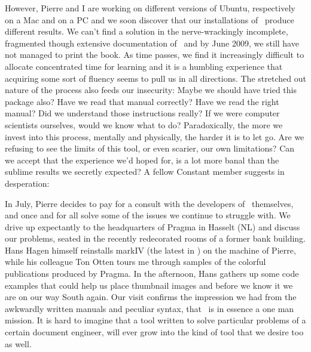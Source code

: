 However, Pierre and I are working on different versions of Ubuntu,
respectively on a Mac and on a PC and we soon discover that our
installations of \ConTeXt\ produce different results. We
can't find a solution in the nerve-wrackingly
incomplete, fragmented though extensive documentation of \ConTeXt\ and by
June 2009, we still have not managed to print the book. As time passes,
we find it increasingly difficult to allocate concentrated time for
learning and it is a humbling experience that acquiring some sort of
fluency seems to pull us in all directions. The stretched out nature of
the process also feeds our insecurity: Maybe we should have tried this
package also? Have we read that manual correctly? Have we read the
right manual? Did we understand those instructions really? If we were
computer scientists ourselves, would we know what to do? Paradoxically,
the more we invest into this process, mentally and physically, the
harder it is to let go. Are we refusing to see the limits of this tool,
or even scarier, our own limitations? Can we accept that the experience
we'd hoped for, is a lot more banal than the sublime
results we secretly expected? A fellow Constant member suggests in
desperation: 


In July, Pierre decides to pay for a consult with the developers of
\ConTeXt\ themselves, and once and for all solve some of the issues we
continue to struggle with. We drive up expectantly to the headquarters
of Pragma in Hasselt (NL) and discuss our problems, seated in the
recently redecorated rooms of a former bank building. Hans Hagen
himself reinstalls markIV (the latest in \ConTeXt) on the machine of
Pierre, while his colleague Ton Otten tours me through samples of the
colorful publications produced by Pragma. In the afternoon, Hans
gathers up some code examples that could help us place thumbnail images
and before we know it we are on our way South again. Our visit confirms
the impression we had from the awkwardly written manuals and peculiar
syntax, that \ConTeXt\ is in essence a one man mission. It is hard to
imagine that a tool written to solve particular problems of a certain
document engineer, will ever grow into the kind of tool that we desire
too as well.

